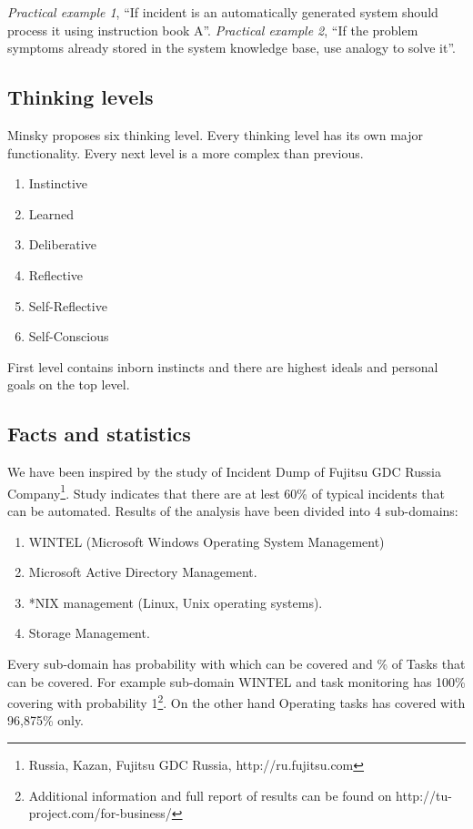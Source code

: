 \documentclass[runningheads,a4paper]{llncs}
\begin{document}
\emph{Practical example 1}, “If incident is an automatically generated system should process it using instruction book A”.
\emph{Practical example 2}, “If the problem symptoms already stored in the system knowledge base, use analogy to solve it”.

\subsection{Thinking levels}

Minsky proposes six thinking level. Every thinking level has its own major functionality. Every next level is a more complex than previous.

\begin{enumerate}
 \item Instinctive
 \item Learned
 \item Deliberative
 \item Reflective
 \item Self-Reflective
 \item Self-Conscious
\end{enumerate}

First level contains inborn instincts and there are highest ideals and personal goals on the top level.

\subsection{Facts and statistics}
We have been inspired by the study of Incident Dump of Fujitsu GDC Russia Company\footnote{Russia, Kazan, Fujitsu GDC Russia, http://ru.fujitsu.com}. Study indicates that there are at lest 60\% of typical incidents that can be automated. Results of the analysis have been divided into 4 sub-domains:
\begin{enumerate}
 \item WINTEL (Microsoft Windows Operating System Management)
 \item Microsoft Active Directory Management.
 \item *NIX management (Linux, Unix operating systems).
 \item Storage Management.
\end{enumerate}

Every sub-domain has probability with which can be covered and \% of Tasks that can be covered. For example sub-domain WINTEL and task monitoring has 100\% covering with probability 1\footnote{Additional information and full report of results can be found on http://tu-project.com/for-business/}. On the other hand Operating tasks has covered with 96,875\% only. 
\end{document}
